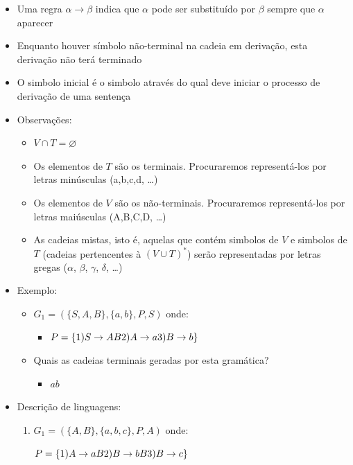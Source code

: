 \documentclass[12pt]{article}
\begin{document}
\begin{itemize}
    \item Uma regra $\alpha \rightarrow \beta$ indica que $\alpha$ pode ser 
    substituído por $\beta$ sempre que $\alpha$ aparecer
    \item Enquanto houver símbolo não-terminal na cadeia em derivação, esta 
    derivação não terá terminado
    \item O simbolo inicial é o simbolo através do qual deve iniciar o processo 
    de derivação de uma sentença
    \item Observações:
    \begin{itemize}
        \item $V \cap T = \varnothing$
        \item Os elementos de $T$ são os terminais. Procuraremos representá-los 
        por letras minúsculas (a,b,c,d, \ldots)
        \item Os elementos de $V$ são os não-terminais. Procuraremos 
        representá-los por letras maiúsculas (A,B,C,D, \ldots)
        \item As cadeias mistas, isto é, aquelas que contém simbolos de $V$ e 
        simbolos de $T$ (cadeias pertencentes à $(V \cup T)^*$) serão 
        representadas por letras gregas ($\alpha$, $\beta$, $\gamma$, $\delta$, 
        \ldots)
    \end{itemize}
    \item Exemplo:
    \begin{itemize}
        \item $G_1 = (\{S,A,B\}, \{a,b\}, P, S)$ onde:
        \begin{itemize}
            \item $P = \{1) S \rightarrow AB \\
            2) A \rightarrow a \\
            3) B \rightarrow b\}$
        \end{itemize}
        \item Quais as cadeias terminais geradas por esta gramática?
        \begin{itemize}[label=R:]
            \item $ab$
        \end{itemize}
    \end{itemize}
    \item Descrição de linguagens:
    \begin{enumerate}
        \item $G_1 = (\{A,B\}, \{a,b,c\}, P, A)$ onde:
        
            $P = \{1) A\rightarrow aB \\
                2) B \rightarrow bB \\
                3) B \rightarrow c \}$


\end{enumerate}
\end{itemize}
\end{document}

